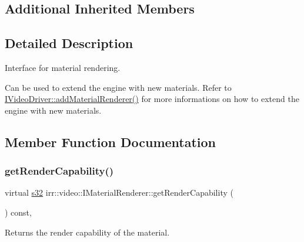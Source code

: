 \subsection*{Additional Inherited Members}


\subsection{Detailed Description}
Interface for material rendering. 

Can be used to extend the engine with new materials. Refer to \hyperlink{classirr_1_1video_1_1IVideoDriver_a0dfc3a7168f3a73a6f4323b579f03ff6}{I\+Video\+Driver\+::add\+Material\+Renderer()} for more informations on how to extend the engine with new materials. 

\subsection{Member Function Documentation}
\mbox{\label{classirr_1_1video_1_1IMaterialRenderer_a5ca13576cb3f466cf2cd9427926121fa}} 
\subsubsection{\texorpdfstring{get\+Render\+Capability()}{getRenderCapability()}\hspace{0.1cm}{\footnotesize\ttfamily [1/2]}}
{\footnotesize\ttfamily virtual \hyperlink{namespaceirr_ac66849b7a6ed16e30ebede579f9b47c6}{s32} irr\+::video\+::\+I\+Material\+Renderer\+::get\+Render\+Capability (\begin{DoxyParamCaption}{ }\end{DoxyParamCaption}) const\hspace{0.3cm}{\ttfamily [inline]}, {\ttfamily [virtual]}}



Returns the render capability of the material. 

